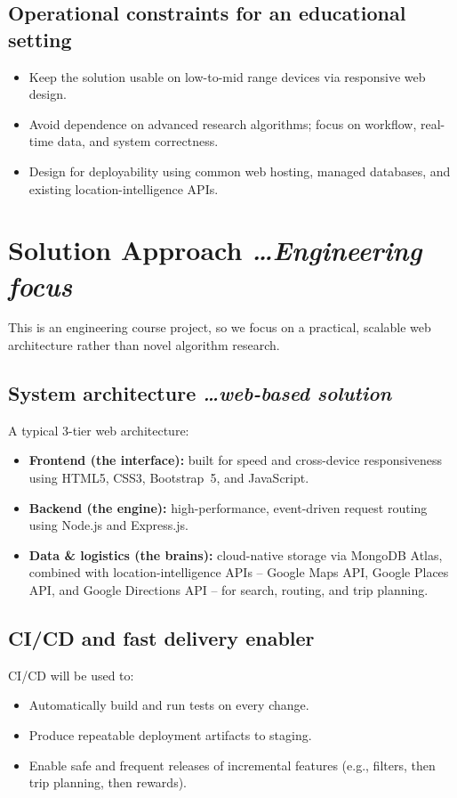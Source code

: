 \documentclass[11pt,a4paper]{article}
\newcommand{\BvrHint}[1]{%
  {\normalfont\normalsize\itshape\hfill #1}}
\begin{document}
\subsection{Operational constraints for an educational setting}
\begin{itemize}[leftmargin=0.7cm]
    \item Keep the solution usable on low-to-mid range devices via responsive web design.
    \item Avoid dependence on advanced research algorithms; focus on workflow, real-time data, and system correctness.
    \item Design for deployability using common web hosting, managed databases, and existing location-intelligence APIs.
\end{itemize}

\section{Solution Approach %
\BvrHint{\ldots Engineering focus}}
This is an engineering course project, so we focus on a
practical, scalable web architecture rather than novel
algorithm research.

\subsection{System architecture %
\BvrHint{\ldots web-based solution}}
A typical 3-tier web architecture:
\begin{itemize}[leftmargin=0.7cm]
    \item \textbf{Frontend (the interface):} built for speed and cross-device responsiveness using HTML5, CSS3, Bootstrap~5, and JavaScript.
    \item \textbf{Backend (the engine):} high-performance, event-driven request routing using Node.js and Express.js.
    \item \textbf{Data \& logistics (the brains):} cloud-native storage via MongoDB Atlas, combined with location-intelligence APIs -- Google Maps API, Google Places API, and Google Directions API -- for search, routing, and trip planning.
\end{itemize}

\subsection{CI/CD and fast delivery enabler}
CI/CD will be used to:
\begin{itemize}[leftmargin=0.7cm]
    \item Automatically build and run tests on every change.
    \item Produce repeatable deployment artifacts to staging.
    \item Enable safe and frequent releases of incremental features (e.g., filters, then trip planning, then rewards).
\end{itemize}
\end{document}
